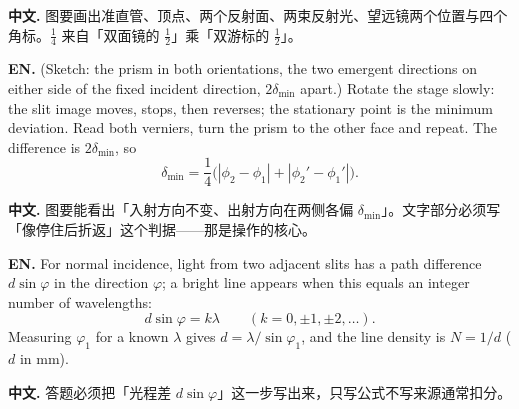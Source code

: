 \textbf{中文.} 图要画出准直管、顶点、两个反射面、两束反射光、望远镜两个位置与四个角标。$\tfrac14$ 来自「双面镜的 $\tfrac12$」乘「双游标的 $\tfrac12$」。


\textbf{EN.} (Sketch: the prism in both orientations, the two emergent directions on either side of the fixed incident direction, $2\delta_{\min}$ apart.) Rotate the stage slowly: the slit image moves, stops, then reverses; the stationary point is the minimum deviation. Read both verniers, turn the prism to the other face and repeat. The difference is $2\delta_{\min}$, so
\[
\delta_{\min}=\frac14\bigl(|\phi_2-\phi_1|+|\phi_2'-\phi_1'|\bigr).
\]

\textbf{中文.} 图要能看出「入射方向不变、出射方向在两侧各偏 $\delta_{\min}$」。文字部分必须写「像停住后折返」这个判据——那是操作的核心。


\textbf{EN.} For normal incidence, light from two adjacent slits has a path difference $d\sin\varphi$ in the direction $\varphi$; a bright line appears when this equals an integer number of wavelengths:
\[
d\sin\varphi=k\lambda\qquad(k=0,\pm1,\pm2,\dots).
\]
Measuring $\varphi_1$ for a known $\lambda$ gives $d=\lambda/\sin\varphi_1$, and the line density is $N=1/d$ ($d$ in mm).

\textbf{中文.} 答题必须把「光程差 $d\sin\varphi$」这一步写出来，只写公式不写来源通常扣分。


